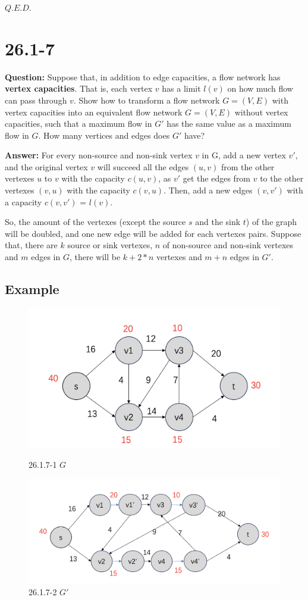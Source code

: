 \documentclass[12pt]{article}
\begin{document}
$Q.E.D.$

\section{26.1-7}
\textbf{Question:} Suppose that, in addition to edge capacities, a flow network has \textbf{vertex capacities}. That is, each vertex $v$ has a limit $l(v)$ on how much flow can pass through $v$. Show how to transform a flow network $G = (V, E) $ with vertex capacities into an equivalent flow network $G = (V, E) $ without vertex capacities, such that a maximum flow in $G'$ has the same value as a maximum flow in $G$. How many vertices and edges does  $G'$ have?

\textbf{Answer:} 
For every non-source and non-sink vertex $v$ in G, add a new vertex $v'$, and the original vertex $v$ will succeed all the edges $(u, v)$ from the other vertexes $u$ to $v$ with the capacity $c(u, v)$, as $v'$ get the edges from $v$ to the other vertexes $(v, u)$ with the capacity  $c(v, u)$.
Then, add a new edges  $(v, v')$ with a capacity $c(v, v')$ = $l(v)$.

So, the amount of the vertexes (except the source $s$ and the sink $t$) of the graph will be doubled, and one new edge will be added for each vertexes pairs. 
Suppose that, there are $k$ source or sink vertexes, $n$ of non-source and non-sink vertexes and $m$ edges in $G$, there will be $k + 2*n$ vertexes and $m + n$ edges in $G'$.

\subsection{Example}
\begin{figure}[h]
    \centering
    \includegraphics[width=0.5\linewidth]{26.1.7-1.png}
    \caption{26.1.7-1 $G$}
    \includegraphics[width=0.5\linewidth]{26.1.7-2.png}
    \caption{26.1.7-2 $G'$}
    \label{fig:enter-label}

\end{figure}
\end{document}
